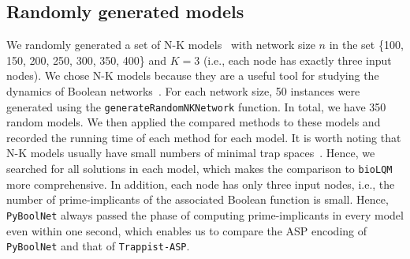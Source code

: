 \documentclass[preprint,12pt]{elsarticle}
\begin{document}
\subsection{Randomly generated models}

We randomly generated a set of N-K models~\cite{glass1973logical} with network size \(n\) in the set \{100, 150, 200, 250, 300, 350, 400\} and \(K = 3\) (i.e., each node has exactly three input nodes).
We chose N-K models because they are a useful tool for studying the dynamics of Boolean networks~\cite{glass1973logical,klarner2015computing,Rozum2021}.
For each network size, 50 instances were generated using the \verb|generateRandomNKNetwork| function.
In total, we have 350 random models.
We then applied the compared methods to these models and recorded the running time of each method for each model.
It is worth noting that N-K models usually have small numbers of minimal trap spaces~\cite{klarner2015computing}.
Hence, we searched for all solutions in each model, which makes the comparison to \texttt{bioLQM} more comprehensive.
In addition, each node has only three input nodes, i.e., the number of prime-implicants of the associated Boolean function is small.
Hence, \texttt{PyBoolNet} always passed the phase of computing prime-implicants in every model even within one second, which enables us to compare the ASP encoding of \texttt{PyBoolNet} and that of \texttt{Trappist-ASP}.
\end{document}
